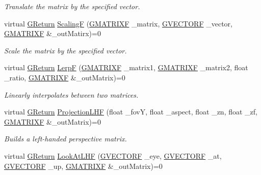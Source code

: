 \begin{DoxyCompactItemize}
\begin{DoxyCompactList}\small\item\em Translate the matrix by the specified vector. \end{DoxyCompactList}\item 
virtual \hyperlink{namespaceGW_a67a839e3df7ea8a5c5686613a7a3de21}{G\+Return} \hyperlink{classGW_1_1MATH_1_1GMatrix_a4342d54e82d03d18e493368e87e90137}{ScalingF} (\hyperlink{structGW_1_1MATH_1_1GMATRIXF}{G\+M\+A\+T\+R\+I\+XF} \+\_\+matrix, \hyperlink{structGW_1_1MATH_1_1GVECTORF}{G\+V\+E\+C\+T\+O\+RF} \+\_\+vector, \hyperlink{structGW_1_1MATH_1_1GMATRIXF}{G\+M\+A\+T\+R\+I\+XF} \&\+\_\+out\+Matirx)=0
\begin{DoxyCompactList}\small\item\em Scale the matrix by the specified vector. \end{DoxyCompactList}\item 
virtual \hyperlink{namespaceGW_a67a839e3df7ea8a5c5686613a7a3de21}{G\+Return} \hyperlink{classGW_1_1MATH_1_1GMatrix_a677534c072e7cb8d93223fdc05ae1957}{LerpF} (\hyperlink{structGW_1_1MATH_1_1GMATRIXF}{G\+M\+A\+T\+R\+I\+XF} \+\_\+matrix1, \hyperlink{structGW_1_1MATH_1_1GMATRIXF}{G\+M\+A\+T\+R\+I\+XF} \+\_\+matrix2, float \+\_\+ratio, \hyperlink{structGW_1_1MATH_1_1GMATRIXF}{G\+M\+A\+T\+R\+I\+XF} \&\+\_\+out\+Matrix)=0
\begin{DoxyCompactList}\small\item\em Linearly interpolates between two matrices. \end{DoxyCompactList}\item 
virtual \hyperlink{namespaceGW_a67a839e3df7ea8a5c5686613a7a3de21}{G\+Return} \hyperlink{classGW_1_1MATH_1_1GMatrix_a1e46cce75764e9b92a31a84ceb9ffc3b}{Projection\+L\+HF} (float \+\_\+fovY, float \+\_\+aspect, float \+\_\+zn, float \+\_\+zf, \hyperlink{structGW_1_1MATH_1_1GMATRIXF}{G\+M\+A\+T\+R\+I\+XF} \&\+\_\+out\+Matrix)=0
\begin{DoxyCompactList}\small\item\em Builds a left-\/handed perspective matrix. \end{DoxyCompactList}\item 
virtual \hyperlink{namespaceGW_a67a839e3df7ea8a5c5686613a7a3de21}{G\+Return} \hyperlink{classGW_1_1MATH_1_1GMatrix_a33fa9f8f7f8b700f170d1e2654bbfc3b}{Look\+At\+L\+HF} (\hyperlink{structGW_1_1MATH_1_1GVECTORF}{G\+V\+E\+C\+T\+O\+RF} \+\_\+eye, \hyperlink{structGW_1_1MATH_1_1GVECTORF}{G\+V\+E\+C\+T\+O\+RF} \+\_\+at, \hyperlink{structGW_1_1MATH_1_1GVECTORF}{G\+V\+E\+C\+T\+O\+RF} \+\_\+up, \hyperlink{structGW_1_1MATH_1_1GMATRIXF}{G\+M\+A\+T\+R\+I\+XF} \&\+\_\+out\+Matrix)=0

\end{DoxyCompactItemize}
